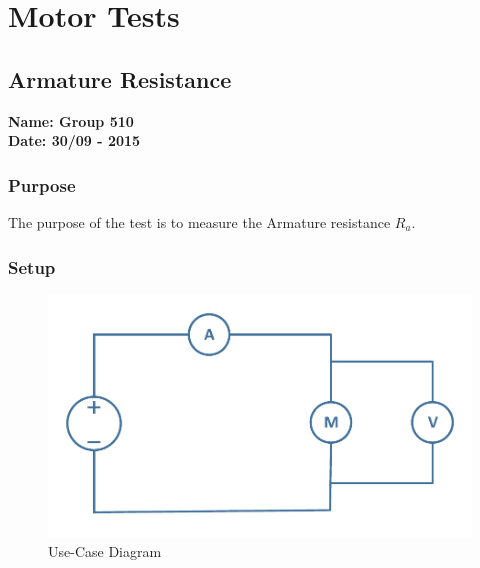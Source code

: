 \pagebreak
\section{Motor Tests}
\nopagebreak
\subsection{Armature Resistance} %
\textbf{Name: Group 510}\\
\textbf{Date: 30/09 - 2015}

\subsubsection{Purpose}
The purpose of the test is to measure the Armature resistance $R_a$.

\subsubsection{Setup}
\begin{figure}[H]
  \centering
	\includegraphics[scale=0.5]{figures/MotorTest1.pdf}
	\caption{Use-Case Diagram}
\end{figure}

